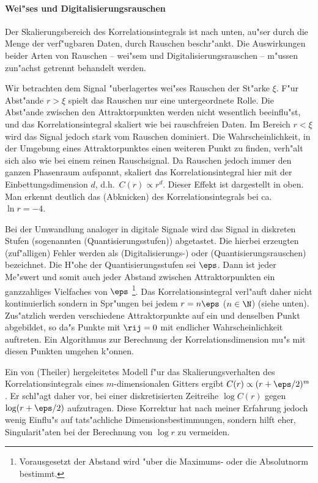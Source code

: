 \paragraph{Wei"ses und Digitalisierungsrauschen}
Der Skalierungsbereich des Korrelationsintegrals ist nach unten, au"ser durch die Menge der 
verf"ugbaren Daten, durch Rauschen beschr"ankt. Die Auswirkungen beider Arten von
Rauschen -- wei"sem und Digitalisierungsrauschen -- m"ussen zun"achst getrennt behandelt
werden. 

Wir betrachten dem Signal "uberlagertes wei"ses Rauschen der St"arke $\xi$. F"ur Abst"ande 
$r>\xi$ spielt das Rauschen nur eine untergeordnete Rolle. Die Abst"ande zwischen den
Attraktorpunkten werden nicht wesentlich beeinflu"st, und das Korrelationsintegral skaliert 
wie bei rauschfreien Daten. 
Im Bereich $r<\xi$ wird das Signal jedoch stark vom Rauschen dominiert. Die
Wahrscheinlichkeit, in der Umgebung eines Attraktorpunktes einen weiteren Punkt zu finden,
verh"alt sich also wie bei einem reinen Rauschsignal. Da Rauschen jedoch immer den ganzen
Phasenraum aufspannt, skaliert das Korrelationsintegral hier mit der Einbettungsdimension
$d$, d.h.\  $C(r)\propto r^d$. Dieser Effekt ist dargestellt in  oben.
Man erkennt deutlich das \naja(Abknicken) des Korrelationsintegrals bei ca.\  $\ln r=-4$. 

Bei der Umwandlung analoger in digitale Signale wird das Signal in diskreten Stufen
(sogenannten \begriff(Quantisierungsstufen)) abgetastet.  Die hierbei erzeugten
(zuf"alligen) Fehler werden als \begriff(Digitalisierungs-) oder
\begriff(Quantisierungsrauschen) bezeichnet.  Die H"ohe der Quantisierungsstufen sei
$\eps$.  Dann ist jeder Me"swert und somit auch jeder Abstand zwischen Attraktorpunkten
ein ganzzahliges Vielfaches von $\eps$ \footnote{Vorausgesetzt der Abstand wird "uber
  die Maximums- oder die Absolutnorm bestimmt.}. Das Korrelationsintegral verl"auft
daher nicht kontinuierlich sondern in Spr"ungen bei jedem $r=n\eps$ ($n\in\N$) (siehe
 unten).  Zus"atzlich werden verschiedene Attraktorpunkte auf ein und
denselben Punkt abgebildet, so da"s Punkte mit $\rij=0$ mit endlicher Wahrscheinlichkeit
auftreten. Ein Algorithmus zur Berechnung der Korrelationsdimension mu"s mit diesen
Punkten umgehen k"onnen.

Ein von \autor(Theiler) hergeleitetes Modell f"ur das Skalierungsverhalten des
Korrelationsintegrals eines $m$-dimensionalen Gitters ergibt $C(r)\propto(r+\eps/2)^m$ \cite{Theiler}. Er 
schl"agt daher vor, bei einer diskretisierten Zeitreihe $\log C(r)$ gegen $\log(r+\eps/2)$
aufzutragen. Diese Korrektur hat nach meiner Erfahrung jedoch wenig
Einflu"s auf tats"achliche Dimensionsbestimmungen, sondern hilft eher, Singularit"aten 
bei der Berechnung von $\log r$ zu vermeiden.

